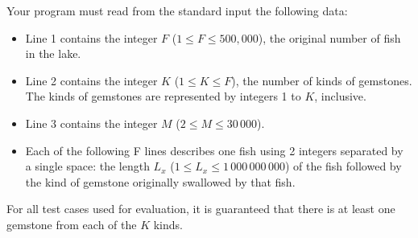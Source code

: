 Your program must read from the standard input the following data:
\begin{itemize}
\item Line 1 contains the integer $F$ ($1 \le F \le 500,000$), the original number of fish in the lake.
\item Line 2 contains the integer $K$ ($1 \le K \le F$), the number of kinds of gemstones.
The kinds of gemstones are represented by integers 1 to $K$, inclusive.
\item Line 3 contains the integer $M$ ($2 \le M \le 30\,000$).
\item Each of the following F lines describes one fish using 2 integers separated by a single space: the length $L_x$ ($1 \le L_x \le 1\,000\,000\,000$) of the fish followed by the kind of gemstone originally swallowed by that fish.
\end{itemize}

For all test cases used for evaluation, it is guaranteed that there is at least one gemstone from each of the $K$ kinds.